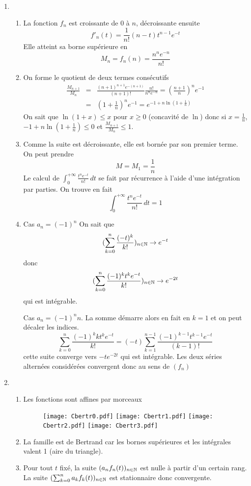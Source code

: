 \begin{enumerate}
\item \begin{enumerate}
\item La fonction $f_{n}$ est croissante de 0 à $n$, décroissante ensuite
$$f'_{n}(t)=\frac{1}{n!}(n-t)t^{n-1}e^{-t}$$
Elle atteint sa borne supérieure en 
$$M_{n}=f_{n}(n)=\frac{n^{n}e^{-n}}{n!}$$
\item On forme le quotient de deux termes consécutifs
\begin{eqnarray*}
\frac{M_{n+1}}{M_{n}}&=&\frac{(n+1)^{n+1}e^{-(n+1)}}{(n+1)!}\frac{n!}{n^{n}e^{-n}}=\left(\frac{n+1}{n}\right)^{n}e^{-1}\\&=&\left(1+\frac{1}{n}\right)^{n}e^{-1}=e^{-1+n\ln (1+\frac{1}{n})}
\end{eqnarray*}
On sait que $\ln (1+x)\leq x$ pour $x\geq 0$ (concavité de $\ln$) donc si $x=\frac{1}{n}$,$-1+n\ln (1+\frac{1}{n})\leq 0$ et $\frac{M_{n+1}}{M_{n}}\leq 1$.
\item Comme la suite est décroissante, elle est bornée par son premier terme. On peut prendre $$M=M_{1}=\frac{1}{n}$$
Le calcul de $\int_{0}^{+\infty}\frac{t^{n}e^{-t}}{n!}\,dt$ se fait par récurrence à l'aide d'une intégration par parties. On trouve en fait 
$$\int_{0}^{+\infty}\frac{t^{n}e^{-t}}{n!}\,dt = 1$$
\item Cas $a_{n}=(-1)^{n}$ On sait que 
$$(\sum _{k=0}^{n}\frac{(-t)^{k}}{k!})_{n\in \Bbb{N}}\rightarrow e^{-t}$$
donc
$$(\sum _{k=0}^{n}\frac{(-1)^{k}t^{k}e^{-t}}{k!})_{n\in \Bbb{N}}\rightarrow e^{-2t}$$
qui est intégrable.

Cas $a_{n}=(-1)^{n}n$. La somme démarre alors en fait en $k=1$ et on peut décaler les indices.
\[\sum _{k=0}^{n}\frac{(-1)^{k} k t^{k}e^{-t}}{k!}= (-t)\sum _{k=1}^{n-1}\frac{(-1)^{k-1}t^{k-1}e^{-t}}{(k-1)!}\]
cette suite converge vers $-te^{-2t}$ qui est intégrable. Les deux séries alternées considérées convergent donc au sens de $(f_{n})$
\end{enumerate}
\item \begin{enumerate}
\item Les fonctions sont affines par morceaux
\begin{figure}
   \centering
   \texttt{[image: Cbertr0.pdf]}
   \texttt{[image: Cbertr1.pdf]}
   \texttt{[image: Cbertr2.pdf]}
   \texttt{[image: Cbertr3.pdf]}
\end{figure}
\item La famille est de Bertrand car les bornes supérieures et les intégrales valent 1 (aire du triangle).
\item Pour tout $t$ fixé, la suite $(a_n f_{n}(t))_{n\in \Bbb{N}}$ est nulle à partir d'un certain rang. La suite $(\sum _{k=0}^{n}a_k f_{k}(t))_{n\in \Bbb{N}}$ est stationnaire donc convergente.


\end{enumerate}
\end{enumerate}
